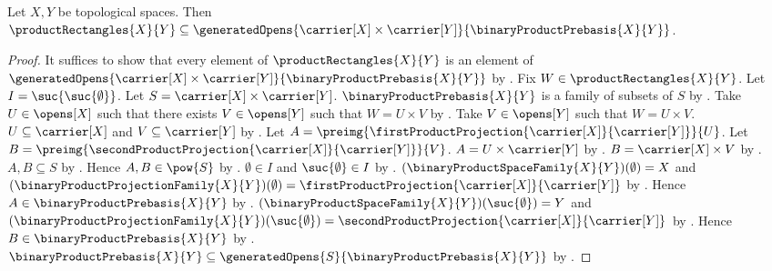\begin{proposition}\label{product_rectangles_in_generated_product_opens}
    Let $X,Y$ be topological spaces.
    Then $\productRectangles{X}{Y}\subseteq
        \generatedOpens{
            \carrier[X]\times\carrier[Y]}{
            \binaryProductPrebasis{X}{Y}}$.
\end{proposition}
\begin{proof}
    It suffices to show that every element of $\productRectangles{X}{Y}$
        is an element of
        $\generatedOpens{
            \carrier[X]\times\carrier[Y]}{
            \binaryProductPrebasis{X}{Y}}$ by
        .
    Fix $W\in\productRectangles{X}{Y}$.
    Let $I=\suc{\suc{\emptyset}}$.
    Let $S=\carrier[X]\times\carrier[Y]$.
    $\binaryProductPrebasis{X}{Y}$ is a family of subsets of $S$ by
        .
    Take $U\in\opens[X]$ such that there exists $V\in\opens[Y]$
        such that $W=U\times V$ by .
    Take $V\in\opens[Y]$ such that $W=U\times V$.
    $U\subseteq\carrier[X]$ and $V\subseteq\carrier[Y]$ by
        .
    Let $A=\preimg{
        \firstProductProjection{\carrier[X]}{\carrier[Y]}}{U}$.
    Let $B=\preimg{
        \secondProductProjection{\carrier[X]}{\carrier[Y]}}{V}$.
    $A=U\times\carrier[Y]$ by
        .
    $B=\carrier[X]\times V$ by
        .
    $A,B\subseteq S$ by .
    Hence $A,B\in\pow{S}$ by .
    $\emptyset\in I$ and $\suc{\emptyset}\in I$ by
        .
    $(\binaryProductSpaceFamily{X}{Y})(\emptyset)=X$ and
        $(\binaryProductProjectionFamily{X}{Y})(\emptyset)
            =\firstProductProjection{\carrier[X]}{\carrier[Y]}$ by
        .
    Hence $A\in\binaryProductPrebasis{X}{Y}$ by
        .
    $(\binaryProductSpaceFamily{X}{Y})(\suc{\emptyset})=Y$ and
        $(\binaryProductProjectionFamily{X}{Y})(\suc{\emptyset})
            =\secondProductProjection{\carrier[X]}{\carrier[Y]}$ by
        .
    Hence $B\in\binaryProductPrebasis{X}{Y}$ by
        .
    $\binaryProductPrebasis{X}{Y}\subseteq
        \generatedOpens{S}{\binaryProductPrebasis{X}{Y}}$ by
        .

\end{proof}

